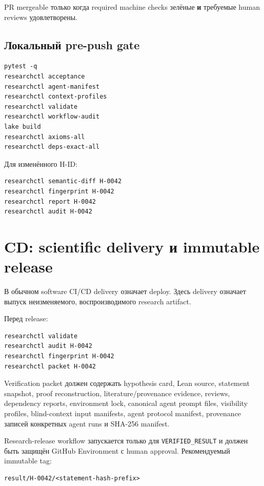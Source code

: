 \documentclass[11pt,a4paper]{article}
\newcommand{\status}[1]{\texttt{#1}}
\begin{document}
PR mergeable только когда required machine checks зелёные \textbf{и} требуемые human reviews удовлетворены.

\subsection{Локальный pre-push gate}

\begin{lstlisting}
pytest -q
researchctl acceptance
researchctl agent-manifest
researchctl context-profiles
researchctl validate
researchctl workflow-audit
lake build
researchctl axioms-all
researchctl deps-exact-all
\end{lstlisting}

Для изменённого H-ID:

\begin{lstlisting}
researchctl semantic-diff H-0042
researchctl fingerprint H-0042
researchctl report H-0042
researchctl audit H-0042
\end{lstlisting}

\section{CD: scientific delivery и immutable release}

В обычном software CI/CD delivery означает deploy. Здесь delivery означает выпуск неизменяемого, воспроизводимого research artifact.

Перед release:

\begin{lstlisting}
researchctl validate
researchctl audit H-0042
researchctl fingerprint H-0042
researchctl packet H-0042
\end{lstlisting}

Verification packet должен содержать hypothesis card, Lean source, statement snapshot, proof reconstruction, literature/provenance evidence, reviews, dependency reports, environment lock, canonical agent prompt files, visibility profiles, blind-context input manifests, agent protocol manifest, provenance записей конкретных agent runs и SHA-256 manifest.

Research-release workflow запускается только для \status{VERIFIED\_RESULT} и должен быть защищён GitHub Environment с human approval. Рекомендуемый immutable tag:

\begin{lstlisting}
result/H-0042/<statement-hash-prefix>
\end{lstlisting}
\end{document}
